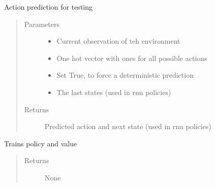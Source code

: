 \documentclass[letterpaper,10pt,english]{sphinxmanual}
\begin{document}
\begin{fulllineitems}
\begin{fulllineitems}
\label{\detokenize{agents.reinforcement_learning:agents.reinforcement_learning.ppo_masked.MaskedPPO.predict}}
\sphinxAtStartPar
Action prediction for testing
\begin{quote}\begin{description}
\item[{Parameters}] \leavevmode\begin{itemize}
\item {} 
\sphinxAtStartPar
{} \textendash{} Current observation of teh environment

\item {} 
\sphinxAtStartPar
{} \textendash{} One hot vector with ones for all possible actions

\item {} 
\sphinxAtStartPar
{} \textendash{} Set True, to force a deterministic prediction

\item {} 
\sphinxAtStartPar
{} \textendash{} The last states (used in rnn policies)

\end{itemize}

\item[{Returns}] \leavevmode
\sphinxAtStartPar
Predicted action and next state (used in rnn policies)

\end{description}\end{quote}

\end{fulllineitems}


\begin{fulllineitems}
\label{\detokenize{agents.reinforcement_learning:agents.reinforcement_learning.ppo_masked.MaskedPPO.train}}
\sphinxAtStartPar
Trains policy and value
\begin{quote}\begin{description}
\item[{Returns}] \leavevmode
\sphinxAtStartPar
None


\end{description}
\end{quote}
\end{fulllineitems}
\end{fulllineitems}
\end{document}
